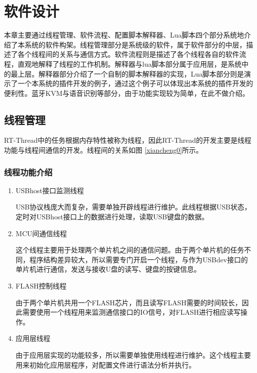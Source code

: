 
\chapter{软件设计}

本章主要通过线程管理、软件流程、配置脚本解释器、Lua脚本四个部分系统地介绍了本系统的软件构架。线程管理部分是系统级的软件，属于软件部分的中层，描述了各个线程间的关系与通信方式。软件流程则是描述了各个线程各自的软件流程，直观地解释了线程的工作机制。解释器与lua脚本部分属于应用层，是系统中的最上层。解释器部分介绍了一个自制的脚本解释器的实现，Lua脚本部分则是演示了一个本系统的插件开发的例子，通过这个例子可以体现出本系统的插件开发的便利性。蓝牙KVM与语音识别等部分，由于功能实现较为简单，在此不做介绍。

\section{线程管理}
RT-Thread中的任务根据内存特性被称为线程，因此RT-Thread的开发主要是线程功能与线程间通信的开发。线程间的关系如图
\ref{xiancheng0}所示。

\subsection{线程功能介绍}
\begin{enumerate}
\item USBhost接口监测线程

USB协议栈庞大而复杂，需要单独开辟线程进行维护。此线程根据USB状态，定时对USBhost接口上的数据进行处理，读取USB键盘的数据。

\item  MCU间通信线程

这个线程主要用于处理两个单片机之间的通信问题。由于两个单片机的任务不同，程序结构差异较大，所以需要专门开启一个线程，与作为USBdev接口的单片机进行通信，发送与接收U盘的读写、键盘的按键信息。

\item FLASH控制线程

由于两个单片机共用一个FLASH芯片，而且读写FLASH需要的时间较长，因此需要使用一个线程用来监测通信接口的IO信号，对FLASH进行相应读写操作。

\item  应用层线程

由于应用层实现的功能较多，所以需要单独使用线程进行维护。这个线程主要用来初始化应用层程序，对配置文件进行语法分析并执行。



\end{enumerate}




